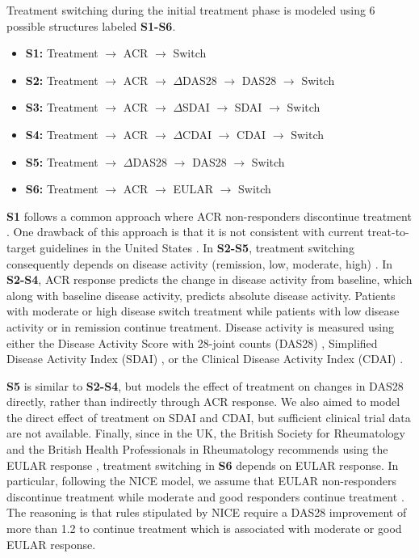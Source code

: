 \documentclass[11pt,final,fleqn]{article}\usepackage[]{graphicx}\usepackage[]{color}
\theoremstyle{plain}
\begin{document}
Treatment switching during the initial treatment phase is modeled using 6 possible structures labeled \textbf{S1-S6}.

\begin{itemize}
\item \textbf{S1:} Treatment $\rightarrow$ ACR $\rightarrow$ Switch
\item \textbf{S2:} Treatment $\rightarrow$ ACR $\rightarrow$ $\Delta$DAS28 $\rightarrow$ DAS28 $\rightarrow$ Switch 
\item \textbf{S3:} Treatment $\rightarrow$ ACR $\rightarrow$ $\Delta$SDAI $\rightarrow$ SDAI $\rightarrow$ Switch 
\item \textbf{S4:} Treatment $\rightarrow$ ACR $\rightarrow$ $\Delta$CDAI $\rightarrow$ CDAI $\rightarrow$ Switch 
\item \textbf{S5:} Treatment $\rightarrow$ $\Delta$DAS28 $\rightarrow$ DAS28 $\rightarrow$ Switch 
\item \textbf{S6:} Treatment $\rightarrow$ ACR $\rightarrow$ EULAR $\rightarrow$ Switch
\end{itemize}

\textbf{S1} follows a common approach where ACR non-responders discontinue treatment \citep[e.g.][]{carlson2015economic, icer2017tim}. One drawback of this approach is that it is not consistent with current treat-to-target guidelines in the United States \citep{singh20162015}. In \textbf{S2-S5}, treatment switching consequently depends on disease activity (remission, low, moderate, high) \citep{anderson2012rheumatoid}. In \textbf{S2-S4}, ACR response predicts the change in disease activity from baseline, which along with baseline disease activity, predicts absolute disease activity. Patients with moderate or high disease switch treatment while patients with low disease activity or in remission continue treatment. Disease activity is measured using either the Disease Activity Score with 28-joint counts (DAS28) \citep{prevoo1995modified}, Simplified Disease Activity Index (SDAI) \citep{smolen2003simplified, aletaha2005simplified}, or the Clinical Disease Activity Index (CDAI) \citep{aletaha2005acute}. 

\textbf{S5} is similar to \textbf{S2-S4}, but models the effect of treatment on changes in DAS28 directly, rather than indirectly through ACR response. We also aimed to model the direct effect of treatment on SDAI and CDAI, but sufficient clinical trial data are not available. Finally, since in the UK, the British Society for Rheumatology and the British Health Professionals in Rheumatology recommends using the EULAR response \citep{deighton2010bsr}, treatment switching in \textbf{S6} depends on EULAR response. In particular, following the NICE model, we assume that EULAR non-responders discontinue treatment while moderate and good responders continue treatment \citep{stevenson2016adalimumab}. The reasoning is that rules stipulated by NICE require a DAS28 improvement of more than 1.2 to continue treatment which is associated with moderate or good EULAR response. 
\end{document}
